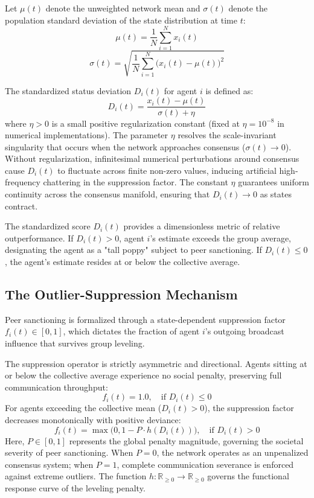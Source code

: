 Let $\mu(t)$ denote the unweighted network mean and $\sigma(t)$ denote the population standard deviation of the state distribution at time $t$\cite{degroot1974reaching}: $$\mu(t) = \frac{1}{N} \sum_{i=1}^N x_i(t)$$ $$\sigma(t) = \sqrt{\frac{1}{N} \sum_{i=1}^N \big(x_i(t) - \mu(t)\big)^2}$$

The standardized status deviation $D_i(t)$ for agent $i$ is defined as\cite{degroot1974reaching}: $$D_i(t) = \frac{x_i(t) - \mu(t)}{\sigma(t) + \eta}$$ where $\eta > 0$ is a small positive regularization constant (fixed at $\eta = 10^{-8}$ in numerical implementations)\cite{acemoglu2013opinion}. The parameter $\eta$ resolves the scale-invariant singularity that occurs when the network approaches consensus ($\sigma(t) \to 0$)\cite{acemoglu2013opinion,hajnal1958weak}. Without regularization, infinitesimal numerical perturbations around consensus cause $D_i(t)$ to fluctuate across finite non-zero values, inducing artificial high-frequency chattering in the suppression factor\cite{acemoglu2013opinion,hajnal1958weak}. The constant $\eta$ guarantees uniform continuity across the consensus manifold, ensuring that $D_i(t) \to 0$ as states contract\cite{acemoglu2013opinion,hajnal1958weak}.

The standardized score $D_i(t)$ provides a dimensionless metric of relative outperformance\cite{degroot1974reaching}. If $D_i(t) > 0$, agent $i$'s estimate exceeds the group average, designating the agent as a "tall poppy" subject to peer sanctioning\cite{degroot1974reaching}. If $D_i(t) \le 0$, the agent's estimate resides at or below the collective average\cite{degroot1974reaching}.

\subsection{The Outlier-Suppression Mechanism}
Peer sanctioning is formalized through a state-dependent suppression factor $f_i(t) \in [0, 1]$, which dictates the fraction of agent $i$'s outgoing broadcast influence that survives group leveling\cite{degroot1974reaching}.

The suppression operator is strictly asymmetric and directional\cite{degroot1974reaching}. Agents sitting at or below the collective average experience no social penalty, preserving full communication throughput\cite{degroot1974reaching}: $$f_i(t) = 1.0, \quad \text{if } D_i(t) \le 0$$ For agents exceeding the collective mean ($D_i(t) > 0$), the suppression factor decreases monotonically with positive deviance\cite{degroot1974reaching}: $$f_i(t) = \max\big(0, 1 - P \cdot h(D_i(t))\big), \quad \text{if } D_i(t) > 0$$ Here, $P \in [0, 1]$ represents the global penalty magnitude, governing the societal severity of peer sanctioning\cite{degroot1974reaching}. When $P = 0$, the network operates as an unpenalized consensus system; when $P = 1$, complete communication severance is enforced against extreme outliers\cite{degroot1974reaching}. The function $h: \mathbb{R}_{\ge 0} \to \mathbb{R}_{\ge 0}$ governs the functional response curve of the leveling penalty\cite{degroot1974reaching}.

